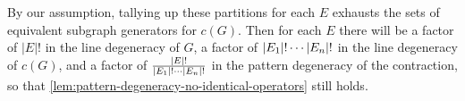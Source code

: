 \documentclass[11pt]{article}
\numberwithin{equation}{section}
\begin{document}
\begin{samepage}
\begin{rmk}
By our assumption, tallying up these partitions for each $E$ exhausts the sets of equivalent subgraph generators for $c(G)$.
Then for each $E$ there will be a factor of $|E|!$ in the line degeneracy of $G$, a factor of $|E_1|!\cdots|E_n|!$ in the line degeneracy of $c(G)$, and a factor of $\frac {|E|!}{|E_1|!\cdots|E_n|!}$ in the pattern degeneracy of the contraction, so that \cref{lem:pattern-degeneracy-no-identical-operators} still holds.
\end{rmk}
\end{samepage}


\begin{thm}\label{thm:wicks-theorem-for-graphs}
\end{thm}
\end{document}

